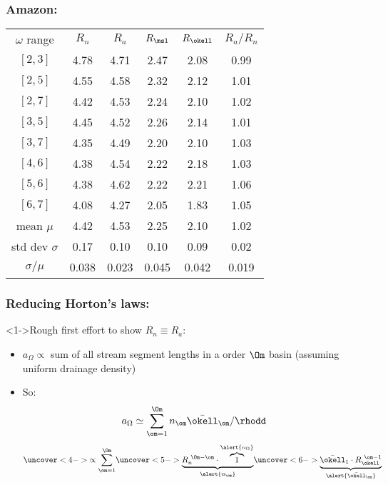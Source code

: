 \begin{frame}[label=]
   \frametitle{Amazon:}

   \begin{tabular}{cccccc}
     $\omega$ range & $R_n$ & $R_a$ & $R_\msl$ & $R_{\okell}$ & $R_a/R_n$ \\
     $[2,3]$ & 4.78 & 4.71 & 2.47 & 2.08 & 0.99 \\
     $[2,5]$ & 4.55 & 4.58 & 2.32 & 2.12 & 1.01 \\
     $[2,7]$ & 4.42 & 4.53 & 2.24 & 2.10 & 1.02 \\
     $[3,5]$ & 4.45 & 4.52 & 2.26 & 2.14 & 1.01 \\
     $[3,7]$ & 4.35 & 4.49 & 2.20 & 2.10 & 1.03 \\
     $[4,6]$ & 4.38 & 4.54 & 2.22 & 2.18 & 1.03 \\
     $[5,6]$ & 4.38 & 4.62 & 2.22 & 2.21 & 1.06 \\
     $[6,7]$ & 4.08 & 4.27 & 2.05 & 1.83 & 1.05 \\
     mean $\mu$ & 4.42 & 4.53 & 2.25 & 2.10 & 1.02 \\
     std dev $\sigma$ & 0.17 &  0.10 & 0.10 & 0.09 & 0.02 \\
     $\sigma/\mu$ & 0.038 &  0.023 & 0.045 & 0.042 & 0.019 \\
   \end{tabular}
\end{frame}


\begin{frame}[label=]
  \frametitle{Reducing Horton's laws:}
  
  \begin{block}<1->{Rough first effort to show $R_n \equiv R_a$:}
    \begin{itemize}
    \item<2-> 
      $a_\Omega \propto$ sum of all stream segment lengths in a order $\Om$ basin
      (assuming uniform drainage density)
    \item<3->
      So:
      $$ a_\Omega \simeq \sum_{\om=1}^{\Om} n_\om \bar{\okell}_\om/\rhodd $$
      $$
      \uncover<4->{
        \propto \sum_{\om=1}^{\Om}
       } 
       \uncover<5->{
         \underbrace{R_n^{\ \Om-\om} \cdot \overbrace{1}^{\alert{n_\Omega}}}_{\alert{n_\om}}
       }
       \uncover<6->{
         \underbrace{\bar{\okell}_1 \cdot R_\okell^{\ \om-1}}_{\alert{\bar{\okell}_\om}}
       }
       $$
    \end{itemize}
  \end{block}
\end{frame}

